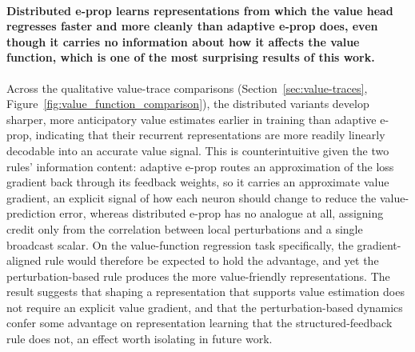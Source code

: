 \paragraph{Distributed e-prop learns representations from which the value head regresses faster and more
cleanly than adaptive e-prop does, even though it carries no information about how it affects the
value function, which is one of the most surprising results of this work.} Across the qualitative
value-trace comparisons (Section~\ref{sec:value-traces}, Figure~\ref{fig:value_function_comparison}),
the distributed variants develop sharper, more anticipatory value estimates earlier in training than
adaptive e-prop, indicating that their recurrent representations are more readily linearly decodable
into an accurate value signal. This is counterintuitive given the two rules' information content:
adaptive e-prop routes an approximation of the loss gradient back through its feedback weights, so it
carries an approximate value gradient, an explicit signal of how each neuron should change to reduce
the value-prediction error, whereas distributed e-prop has no analogue at all, assigning credit only
from the correlation between local perturbations and a single broadcast scalar. On the value-function
regression task specifically, the gradient-aligned rule would therefore be expected to hold the
advantage, and yet the perturbation-based rule produces the more value-friendly representations. The
result suggests that shaping a representation that supports value estimation does not require an
explicit value gradient, and that the perturbation-based dynamics confer some advantage on
representation learning that the structured-feedback rule does not, an effect worth isolating in
future work.


